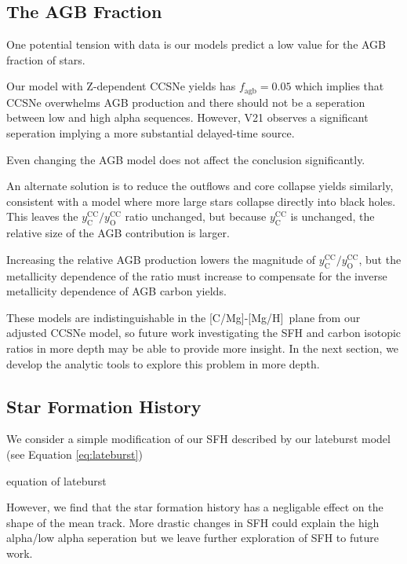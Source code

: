 \documentclass[fleqn,usenatbib]{mnras}
\newcommand{\caah}{[C/Mg]-[Mg/H]}
\begin{document}
\subsection{The AGB Fraction }
One potential tension with data is our models predict a low value for the AGB fraction of stars. 

Our model with Z-dependent CCSNe yields has $f_\text{agb} = 0.05$ which implies that CCSNe overwhelms AGB production and there should not be a seperation between low and high alpha sequences. However, V21 observes a significant seperation implying a more substantial delayed-time source. 

Even changing the AGB model does not affect the conclusion significantly. 

An alternate solution is to reduce the outflows and core collapse yields similarly, consistent with a model where more large stars collapse directly into black holes. This leaves the $y_\text{C}^\text{CC}/y_\text{O}^\text{CC}$ ratio unchanged, but because $y_\text{C}^\text{CC}$ is unchanged, the relative size of the AGB contribution is larger. 


Increasing the relative AGB production lowers the magnitude of  $y_\text{C}^\text{CC}/y_\text{O}^\text{CC}$, but the metallicity dependence of the ratio must increase to compensate for the inverse metallicity dependence of AGB carbon yields. 

These models are indistinguishable in the \caah~plane from our adjusted CCSNe model, so future work investigating the SFH and carbon isotopic ratios in more depth may be able to provide more insight. In the next section, we develop the analytic tools to explore this problem in more depth. 



\subsection{Star Formation History}

We consider a simple modification of our SFH described by our lateburst model
(see Equation \ref{eq:lateburst})

equation of lateburst

However, we find that the star formation history has a negligable effect on the shape of the mean track. More drastic changes in SFH could explain the high alpha/low alpha seperation but we leave further exploration of SFH to future work. 
\end{document}
